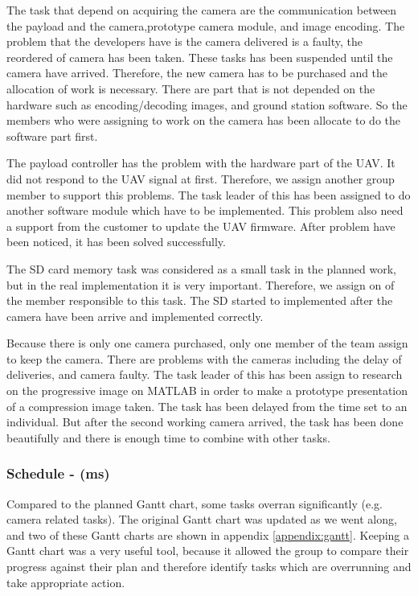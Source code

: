 The task that depend on acquiring the camera are the communication between the payload and the camera,prototype camera module, and image encoding. 
The problem that the developers have is the camera delivered is a faulty, the reordered of camera has been taken.
These tasks has been suspended until the camera have arrived.  
Therefore, the new camera has to be purchased and the allocation of work is necessary. 
There are part that is not depended on the hardware such as encoding/decoding images, and ground station software. 
So the members who were assigning to work on the camera has been allocate to do the software part first.

The payload controller has the problem with the hardware part of the UAV. 
It did not respond to the UAV signal at first. 
Therefore, we assign another group member to support this problems. 
The task leader of this has been assigned to do another software module which have to be implemented. 
This problem also need a support from the customer to update the UAV firmware. 
After problem have been noticed, it has been solved successfully. 

The SD card memory task was considered as a small task in the planned work, but in the real implementation it is very important. 
Therefore, we assign on of the member responsible to this task. 
The SD started to implemented after the camera have been arrive and implemented correctly. 

Because there is only one camera purchased, only one member of the team assign to keep the camera. 
There are problems with the cameras including the delay of deliveries, and camera faulty. 
The task leader of this has been assign to research on the progressive image on MATLAB in order to make a prototype presentation of a compression image taken. 
The task has been delayed from the time set to an individual. 
But after the second working camera arrived, the task has been done beautifully and there is enough time to combine with other tasks.

\subsubsection{Schedule - (ms)}
Compared to the planned Gantt chart, some tasks overran significantly (e.g. camera related tasks). The original Gantt chart was updated as we went along, and two of these Gantt charts are shown in appendix \ref{appendix:gantt}. Keeping a Gantt chart was a very useful tool,  because it allowed the group to compare their progress against their plan and therefore identify tasks which are overrunning and take appropriate action. 

